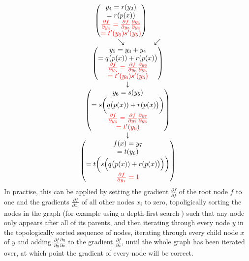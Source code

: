 \begin{equation*}
\begin{matrix}
\begin{matrix}
\begin{pmatrix}
                y_4=r(y_2) \\
                =r(p(x)) \\
                \color{red}{\frac{\partial f}{\partial y_4} = \frac{\partial f}{\partial y_5}\frac{\partial y_5}{\partial y_4}} \\
                \color{red}{= t'(y_6)s'(y_5)}
            \end{pmatrix} \\
            \searrow & \swarrow \\
        \end{matrix} \\
        \begin{pmatrix}
            y_5 = y_3+y_4 \\
            = q\bigl(p(x)) + r(p(x)\bigr) \\
            \color{red}{\frac{\partial f}{\partial y_5} = \frac{\partial f}{\partial y_6}\frac{\partial y_6}{\partial y_5}} \\
            \color{red}{= t'(y_6)s'(y_5)}
        \end{pmatrix} \\
        \downarrow \\
        \begin{pmatrix}
            y_6 = s(y_5) \\
            = s\biggl(q\bigl(p(x)) + r(p(x)\bigr)\biggr) \\
            \color{red}{\frac{\partial f}{\partial y_6} = \frac{\partial f}{\partial y_7}\frac{\partial y_7}{\partial y_6}} \\
            \color{red}{= t'(y_6)}
        \end{pmatrix} \\
        \downarrow \\
        \begin{pmatrix}
            f(x) = y_7 \\
            = t(y_6) \\
            = t\biggl(s\Bigl(q\bigl(p(x)) + r(p(x)\bigr)\Bigr)\biggr) \\
            \color{red}{\frac{\partial f}{\partial y_7} = 1}
        \end{pmatrix}
    \end{matrix}
\end{equation*}
In practise, this can be applied by setting the gradient $\frac{\partial f}{\partial f}$ of the root node $f$ to one and the gradients $\frac{\partial f}{\partial x_i}$ of all other nodes $x_i$ to zero, topoligically sorting the nodes in the graph (for example using a depth-first search \cite{cormen2001section}) such that any node only appears after all of its parents, and then iterating through every node $y$ in the topologically sorted sequence of nodes, iterating through every child node $x$ of $y$ and adding $\frac{\partial f}{\partial y}\frac{\partial y}{\partial x}$ to the gradient $\frac{\partial f}{\partial x}$, until the whole graph has been iterated over, at which point the gradient of every node will be correct.

